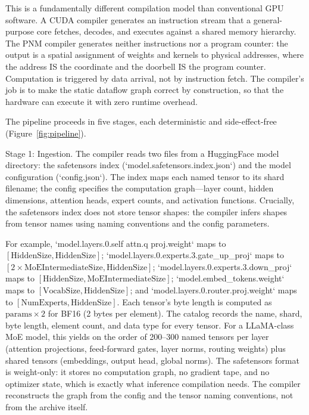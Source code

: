 \documentclass[12pt,onecolumn]{article}
\begin{document}
This is a fundamentally different compilation model than conventional GPU software. A CUDA compiler generates an instruction stream that a general-purpose core fetches, decodes, and executes against a shared memory hierarchy. The PNM compiler generates neither instructions nor a program counter: the output is a spatial assignment of weights and kernels to physical addresses, where the address IS the coordinate and the doorbell IS the program counter. Computation is triggered by data arrival, not by instruction fetch. The compiler's job is to make the static dataflow graph correct by construction, so that the hardware can execute it with zero runtime overhead.

The pipeline proceeds in five stages, each deterministic and side-effect-free (Figure~\ref{fig:pipeline}).

Stage 1: Ingestion. The compiler reads two files from a HuggingFace model directory: the safetensors index (`model.safetensors.index.json`) and the model configuration (`config.json`). The index maps each named tensor to its shard filename; the config specifies the computation graph---layer count, hidden dimensions, attention heads, expert counts, and activation functions. Crucially, the safetensors index does not store tensor shapes: the compiler infers shapes from tensor names using naming conventions and the config parameters.

For example, `model.layers.0.self attn.q proj.weight` maps to $[\mathrm{HiddenSize}, \mathrm{HiddenSize}]$; `model.layers.0.experts.3.gate\_up\_proj` maps to $[2 \times \mathrm{MoEIntermediateSize}, \mathrm{HiddenSize}]$; `model.layers.0.experts.3.down\_proj` maps to $[\mathrm{HiddenSize}, \mathrm{MoEIntermediateSize}]$; `model.embed\_tokens.weight` maps to $[\mathrm{VocabSize}, \mathrm{HiddenSize}]$; and `model.layers.0.router.proj.weight` maps to $[\mathrm{NumExperts}, \mathrm{HiddenSize}]$. Each tensor's byte length is computed as $\mathrm{params} \times 2$ for BF16 (2 bytes per element). The catalog records the name, shard, byte length, element count, and data type for every tensor. For a LLaMA-class MoE model, this yields on the order of 200--300 named tensors per layer (attention projections, feed-forward gates, layer norms, routing weights) plus shared tensors (embeddings, output head, global norms). The safetensors format is weight-only: it stores no computation graph, no gradient tape, and no optimizer state, which is exactly what inference compilation needs. The compiler reconstructs the graph from the config and the tensor naming conventions, not from the archive itself.
\end{document}

